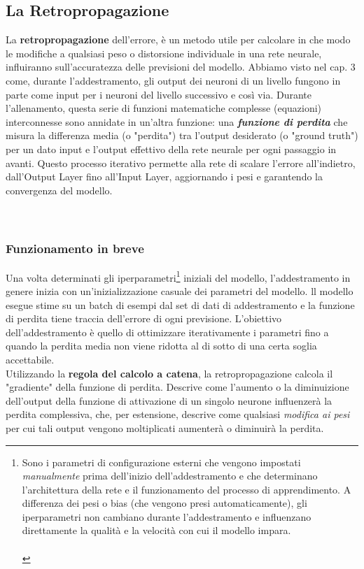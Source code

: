 \documentclass{article}
\begin{document}
\subsection{La Retropropagazione}
La \textbf{retropropagazione} dell'errore, è un metodo utile per calcolare in che modo le modifiche a qualsiasi peso o distorsione individuale in una rete neurale, influiranno sull'accuratezza delle previsioni del modello. Abbiamo visto nel cap. 3 come, durante l'addestramento, gli output dei neuroni di un livello fungono in parte come input per i neuroni del livello successivo e così via. Durante l'allenamento, questa serie di funzioni matematiche complesse (equazioni) interconnesse sono annidate in un'altra funzione: una \textbf{\textit{funzione di perdita}} che misura la differenza media (o "perdita") tra l'output desiderato (o "ground truth") per un dato input e l'output effettivo della rete neurale per ogni passaggio in avanti. Questo processo iterativo permette alla rete di scalare l'errore all'indietro, dall'Output Layer fino all'Input Layer, aggiornando i pesi e garantendo la convergenza del modello.
\\
\\
\\

\subsubsection{Funzionamento in breve}
Una volta determinati gli iperparametri\footnote{Sono i parametri di configurazione esterni che vengono impostati \textit{manualmente} prima dell'inizio dell'addestramento e che determinano l'architettura della rete e il funzionamento del processo di apprendimento. A differenza dei pesi o bias (che vengono presi automaticamente), gli iperparametri non cambiano durante l'addestramento e influenzano direttamente la qualità e la velocità con cui il modello impara.\\\\}  iniziali del modello, l'addestramento in genere inizia con un'inizializzazione casuale dei parametri del modello. ll modello esegue stime su un batch di esempi dal set di dati di addestramento e la funzione di perdita tiene traccia dell'errore di ogni previsione. L'obiettivo dell'addestramento è quello di ottimizzare iterativamente i parametri fino a quando la perdita media non viene ridotta al di sotto di una certa soglia accettabile.\\
Utilizzando la \textbf{regola del calcolo a catena}, la retropropagazione calcola il "gradiente" della funzione di perdita. Descrive come l'aumento o la diminuizione dell'output della funzione di attivazione di un singolo neurone influenzerà la perdita complessiva, che, per estensione, descrive come qualsiasi \textit{modifica ai pesi} per cui tali output vengono moltiplicati aumenterà o diminuirà la perdita.
\end{document}
